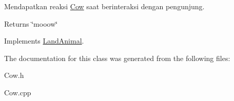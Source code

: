 Mendapatkan reaksi \hyperlink{classCow}{Cow} saat berinteraksi dengan pengunjung. 

\begin{DoxyReturn}{Returns}
\char`\"{}mooow\char`\"{} 
\end{DoxyReturn}


Implements \hyperlink{classLandAnimal}{Land\-Animal}.



The documentation for this class was generated from the following files\-:\begin{DoxyCompactItemize}
\item 
Cow.\-h\item 
Cow.\-cpp\end{DoxyCompactItemize}
